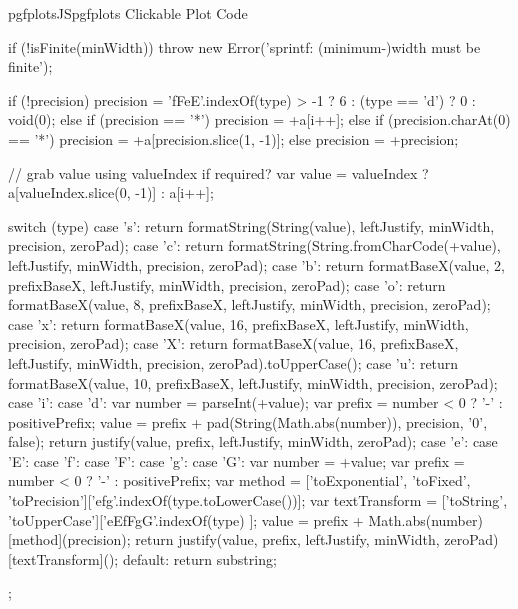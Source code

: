 {{\begin{insDLJS}[processAnnotatedPlot]{pgfplotsJS}{pgfplots Clickable Plot Code}
{{        if (!isFinite(minWidth)) {
            throw new Error('sprintf: (minimum-)width must be finite');
        }

        if (!precision) {
            precision = 'fFeE'.indexOf(type) > -1 ? 6 : (type == 'd') ? 0 : void(0);
        } else if (precision == '*') {
            precision = +a[i++];
        } else if (precision.charAt(0) == '*') {
            precision = +a[precision.slice(1, -1)];
        } else {
            precision = +precision;
        }

        // grab value using valueIndex if required?
        var value = valueIndex ? a[valueIndex.slice(0, -1)] : a[i++];

        switch (type) {
            case 's': return formatString(String(value), leftJustify, minWidth, precision, zeroPad);
            case 'c': return formatString(String.fromCharCode(+value), leftJustify, minWidth, precision, zeroPad);
            case 'b': return formatBaseX(value, 2, prefixBaseX, leftJustify, minWidth, precision, zeroPad);
            case 'o': return formatBaseX(value, 8, prefixBaseX, leftJustify, minWidth, precision, zeroPad);
            case 'x': return formatBaseX(value, 16, prefixBaseX, leftJustify, minWidth, precision, zeroPad);
            case 'X': return formatBaseX(value, 16, prefixBaseX, leftJustify, minWidth, precision, zeroPad).toUpperCase();
            case 'u': return formatBaseX(value, 10, prefixBaseX, leftJustify, minWidth, precision, zeroPad);
            case 'i':
            case 'd': {
                        var number = parseInt(+value);
                        var prefix = number < 0 ? '-' : positivePrefix;
                        value = prefix + pad(String(Math.abs(number)), precision, '0', false);
                        return justify(value, prefix, leftJustify, minWidth, zeroPad);
                    }
            case 'e':
            case 'E':
            case 'f':
            case 'F':
            case 'g':
            case 'G':
                        {
                        var number = +value;
                        var prefix = number < 0 ? '-' : positivePrefix;
                        var method = ['toExponential', 'toFixed', 'toPrecision']['efg'.indexOf(type.toLowerCase())];
                        var textTransform = ['toString', 'toUpperCase']['eEfFgG'.indexOf(type) ];
                        value = prefix + Math.abs(number)[method](precision);
                        return justify(value, prefix, leftJustify, minWidth, zeroPad)[textTransform]();
                    }
            default: return substring;
        }
    };

}
\end{insDLJS}}}
